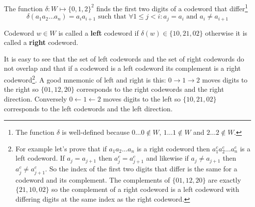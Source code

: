\begin{defn}
The function $\delta: W \mapsto \{0, 1, 2\}^2$ finds the first two digits of a codeword that differ\footnote{The function $\delta$ is well-defined because $0\ldots0 \notin W$, $1\ldots1 \notin W$ and $2\ldots2 \notin W$.}
$$
\delta (a_1 a_2 \ldots a_n) = a_i a_{i+1} \text{ such that } \forall 1 \leq j < i: a_j = a_i \text{ and } a_i \neq a_{i+1}
$$
\end{defn}

\begin{defn}
Codeword $w \in W$ is called a \textbf{left} codeword if $\delta(w) \in \{10, 21, 02\}$ otherwise it is called a \textbf{right} codeword. 
\end{defn}
 
It is easy to see that the set of left codewords and the set of right codewords do not overlap and that if a codeword is a left codeword its complement is a right codeword\footnote{For example let's prove that if $a_1 a_2 \ldots a_n$ is a right codeword then $a_1^c a_2^c \ldots a_n^c$ is a left codeword. If $a_j=a_{j+1}$ then $a_j^c=a_{j+1}^c$ and likewise if $a_j \neq a_{j+1}$ then $a_j^c \neq a_{j+1}^c$. So the index of the first two digits that differ is the same for a codeword and its complement. The complements of $\{01, 12, 20\}$ are exactly $\{21, 10, 02\}$ so the complement of a right codeword is a left codeword with differing digits at the same index as the right codeword.}. A good mnemonic of left and right is this: $0 \rightarrow 1 \rightarrow 2$ moves digits to the right so $\{01, 12, 20\}$ corresponds to the right codewords and the right direction. Conversely $0 \leftarrow 1 \leftarrow 2$ moves digits to the left so $\{10, 21, 02\}$ corresponds to the left codewords and the left direction.

